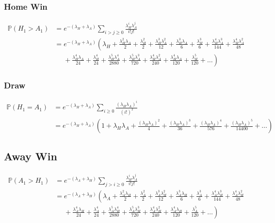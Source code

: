 \documentclass[a4paper,11pt,oneside]{book}
\theoremstyle{plain}
\theoremstyle{definition}
\begin{document}
\subsubsection{Home Win}
\begin{align*}
\mathbb{P}(H_1>A_1)&=e^{-(\lambda_H+\lambda_A)}\sum_{i>j\ge 0}\frac{\lambda_H^i\lambda_A^j}{i!j!}\\
&=e^{-(\lambda_H+\lambda_A)}\left(\lambda_H+\frac{\lambda_H^2\lambda_A}{2}+\frac{\lambda_H^2}{2}+\frac{\lambda_H^3\lambda_A^2}{12}+\frac{\lambda_H^3\lambda_A}{6}+\frac{\lambda_H^3}{6}+\frac{\lambda_H^4\lambda_A^3}{144}+\frac{\lambda_H^4\lambda_A^2}{48}\right.\\
&\left.\phantom{=}+\frac{\lambda_H^4\lambda_A}{24}+\frac{\lambda_H^4}{24}+\frac{\lambda_H^5\lambda_A^4}{2880}+\frac{\lambda_H^5\lambda_A^3}{720}+\frac{\lambda_H^4\lambda_A^2}{240}+\frac{\lambda_H^4\lambda_A}{120}+\frac{\lambda_H^5}{120}+\ldots\right)
\end{align*}
\subsubsection{Draw}
\begin{align*}
\mathbb{P}(H_1=A_1)&=e^{-(\lambda_H+\lambda_A)}\sum_{i\ge 0}\frac{(\lambda_H\lambda_A)^i}{(i!)^2}\\
&=e^{-(\lambda_H+\lambda_A)}\left(1+\lambda_H\lambda_A+\frac{(\lambda_H\lambda_A)^2}{4}+\frac{(\lambda_H\lambda_A)^3}{36}+\frac{(\lambda_H\lambda_A)^4}{576}+\frac{(\lambda_H\lambda_A)^5}{14400}+\ldots\right)
\end{align*}
\subsection{Away Win}
\begin{align*}
\mathbb{P}(A_1>H_1)&=e^{-(\lambda_A+\lambda_H)}\sum_{j>i\ge 0}\frac{\lambda_H^i\lambda_A^j}{i!j!}\\
&=e^{-(\lambda_A+\lambda_H)}\left(\lambda_A+\frac{\lambda_A^2\lambda_H}{2}+\frac{\lambda_A^2}{2}+\frac{\lambda_A^3\lambda_H^2}{12}+\frac{\lambda_A^3\lambda_H}{6}+\frac{\lambda_A^3}{6}+\frac{\lambda_A^4\lambda_H^3}{144}+\frac{\lambda_A^4\lambda_H^2}{48}\right.\\
&\left.\phantom{=}+\frac{\lambda_A^4\lambda_H}{24}+\frac{\lambda_A^4}{24}+\frac{\lambda_A^5\lambda_H^4}{2880}+\frac{\lambda_A^5\lambda_H^3}{720}+\frac{\lambda_A^4\lambda_H^2}{240}+\frac{\lambda_A^4\lambda_H}{120}+\frac{\lambda_A^5}{120}+\ldots\right)
\end{align*}
\end{document}
